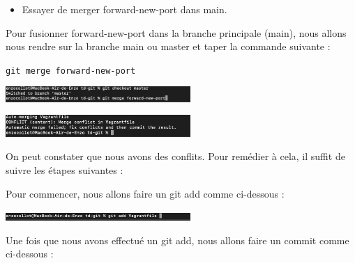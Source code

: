 \documentclass[12pt]{article}
\begin{document}
\vspace{0.3cm}

\begin{itemize}
  \item Essayer de merger forward-new-port dans main.
\end{itemize}

\vspace{0.3cm}

Pour fusionner forward-new-port dans la branche principale (main), nous allons nous rendre sur la branche main ou master et taper la commande suivante :

\texttt{git merge forward-new-port}

\vspace{0.3cm}

\begin{center}
  \includegraphics[width=7cm]{Image-TD-Git-4/git-merge.png}
\end{center}

\vspace{0.3cm}

\begin{center}
  \includegraphics[width=7cm]{Image-TD-Git-4/Conflits.png}
\end{center}

\vspace{0.3cm}

On peut constater que nous avons des conflits. Pour remédier à cela, il suffit de suivre les étapes suivantes :

\vspace{0.3cm}

Pour commencer, nous allons faire un git add comme ci-dessous :

\vspace{0.3cm}

\begin{center}
  \includegraphics[width=7cm]{Image-TD-Git-4/git add.png}
\end{center}

\vspace{0.3cm}

Une fois que nous avons effectué un git add, nous allons faire un commit comme ci-dessous :
\end{document}
